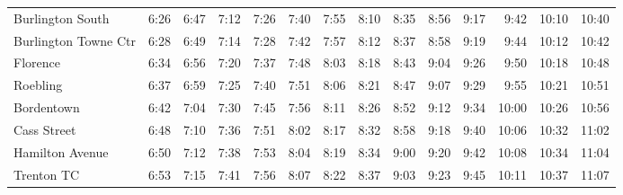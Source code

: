 \begin{center}
\begin{tabular}{@{}lrrrrrrrrrrrrr@{}}
Burlington South & 6:26 & 6:47 & 7:12 & 7:26 & 7:40 & 7:55 & 8:10 & 8:35 & 8:56 & 9:17 & 9:42 & 10:10 & 10:40 \\
Burlington Towne Ctr & 6:28 & 6:49 & 7:14 & 7:28 & 7:42 & 7:57 & 8:12 & 8:37 & 8:58 & 9:19 & 9:44 & 10:12 & 10:42 \\
Florence & 6:34 & 6:56 & 7:20 & 7:37 & 7:48 & 8:03 & 8:18 & 8:43 & 9:04 & 9:26 & 9:50 & 10:18 & 10:48 \\
Roebling & 6:37 & 6:59 & 7:25 & 7:40 & 7:51 & 8:06 & 8:21 & 8:47 & 9:07 & 9:29 & 9:55 & 10:21 & 10:51 \\
Bordentown & 6:42 & 7:04 & 7:30 & 7:45 & 7:56 & 8:11 & 8:26 & 8:52 & 9:12 & 9:34 & 10:00 & 10:26 & 10:56 \\
Cass Street & 6:48 & 7:10 & 7:36 & 7:51 & 8:02 & 8:17 & 8:32 & 8:58 & 9:18 & 9:40 & 10:06 & 10:32 & 11:02 \\
Hamilton Avenue & 6:50 & 7:12 & 7:38 & 7:53 & 8:04 & 8:19 & 8:34 & 9:00 & 9:20 & 9:42 & 10:08 & 10:34 & 11:04 \\
Trenton TC & 6:53 & 7:15 & 7:41 & 7:56 & 8:07 & 8:22 & 8:37 & 9:03 & 9:23 & 9:45 & 10:11 & 10:37 & 11:07 \\
\bottomrule\end{tabular}\end{center}
